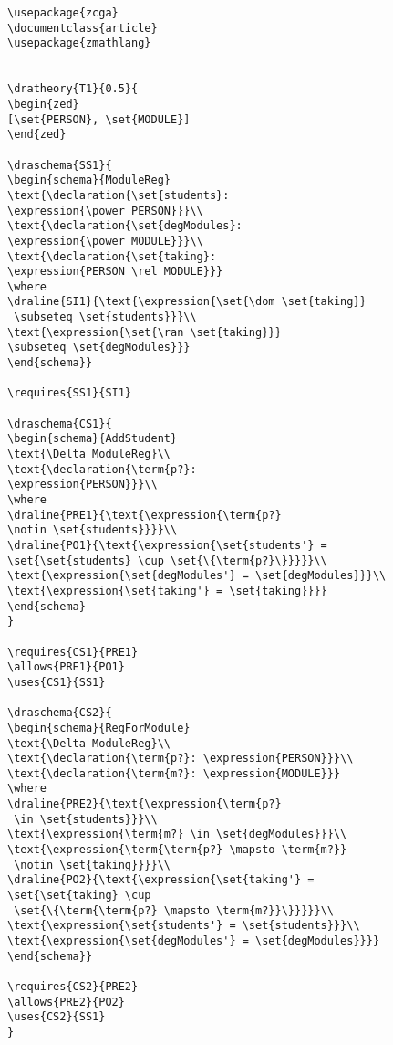 \begin{verbatim}
\usepackage{zcga}
\documentclass{article}
\usepackage{zmathlang}


\dratheory{T1}{0.5}{
\begin{zed}
[\set{PERSON}, \set{MODULE}]
\end{zed}

\draschema{SS1}{
\begin{schema}{ModuleReg}
\text{\declaration{\set{students}:
\expression{\power PERSON}}}\\
\text{\declaration{\set{degModules}:
\expression{\power MODULE}}}\\
\text{\declaration{\set{taking}:
\expression{PERSON \rel MODULE}}}
\where
\draline{SI1}{\text{\expression{\set{\dom \set{taking}}
 \subseteq \set{students}}}\\
\text{\expression{\set{\ran \set{taking}}} 
\subseteq \set{degModules}}}
\end{schema}}

\requires{SS1}{SI1}

\draschema{CS1}{
\begin{schema}{AddStudent}
\text{\Delta ModuleReg}\\
\text{\declaration{\term{p?}: 
\expression{PERSON}}}\\
\where
\draline{PRE1}{\text{\expression{\term{p?} 
\notin \set{students}}}}\\
\draline{PO1}{\text{\expression{\set{students'} = 
\set{\set{students} \cup \set{\{\term{p?}\}}}}}\\
\text{\expression{\set{degModules'} = \set{degModules}}}\\
\text{\expression{\set{taking'} = \set{taking}}}}
\end{schema}
}

\requires{CS1}{PRE1}
\allows{PRE1}{PO1}
\uses{CS1}{SS1}

\draschema{CS2}{
\begin{schema}{RegForModule}
\text{\Delta ModuleReg}\\
\text{\declaration{\term{p?}: \expression{PERSON}}}\\
\text{\declaration{\term{m?}: \expression{MODULE}}}
\where
\draline{PRE2}{\text{\expression{\term{p?}
 \in \set{students}}}\\
\text{\expression{\term{m?} \in \set{degModules}}}\\
\text{\expression{\term{\term{p?} \mapsto \term{m?}}
 \notin \set{taking}}}}\\
\draline{PO2}{\text{\expression{\set{taking'} = 
\set{\set{taking} \cup
 \set{\{\term{\term{p?} \mapsto \term{m?}}\}}}}}\\
\text{\expression{\set{students'} = \set{students}}}\\
\text{\expression{\set{degModules'} = \set{degModules}}}}
\end{schema}}

\requires{CS2}{PRE2}
\allows{PRE2}{PO2}
\uses{CS2}{SS1}
}

\end{verbatim}